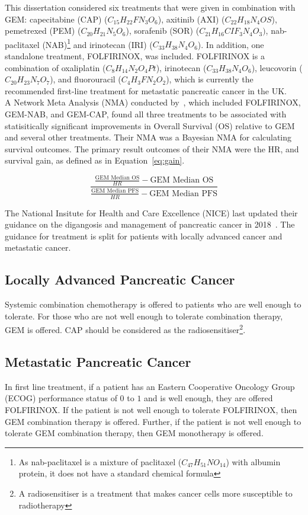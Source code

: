 This dissertation considered six treatments that were given in combination with GEM: capecitabine (CAP) ($C_{15}H_{22}FN_3O_6$), axitinib (AXI) ($C_{22}H_{18}N_4OS$), pemetrexed (PEM) ($C_{20}H_{21}N_5O_6$), sorafenib (SOR) ($C_{21}H_{16}CIF_{3}N_4O_3)$, nab-paclitaxel (NAB)\footnote{As nab-paclitaxel is a mixture of paclitaxel ($C_{47}H_{51}NO_{14}$) with albumin protein, it does not have a standard chemical formula} and irinotecan (IRI) ($C_{33}H_{38}N_4O_6$). In addition, one standalone treatment, FOLFIRINOX, was included. FOLFIRINOX is a combination of oxaliplatin ($C_{8}H_{14}N_{2}O_{4}Pt$), irinotecan ($C_{33}H_{38}N_{4}O_{6}$), leucovorin ($C_{20}H_{23}N_{7}O_{7}$), and fluorouracil ($C_{4}H_{3}FN_{2}O_{2}$), which is currently the recommended first-line treatment for metastatic pancreatic cancer in the UK.\\

A Network Meta Analysis (NMA) conducted by~\cite{gresham2014}, which included FOLFIRINOX, GEM-NAB, and GEM-CAP, found all three treatments to be associated with statisitically significant improvements in Overall Survival (OS) relative to GEM and several other treatments. Their NMA was a Bayesian NMA for calculating survival outcomes. The primary result outcomes of their NMA were the HR, and survival gain, as defined as in Equation~\ref{eq:gain}. 

\begin{equation}
    \frac{\frac{\text{GEM Median OS}}{HR}-\text{GEM Median OS}}{\frac{\text{GEM Median PFS}}{HR}-\text{GEM Median PFS}}
    \label{eq:gain}
\end{equation}

The National Insitute for Health and Care Excellence (NICE) last updated their guidance on the digangosis and management of pancreatic cancer in 2018~\cite{NG85}. The guidance for treatment is split for patients with locally advanced cancer and metastatic cancer.

\subsection{Locally Advanced Pancreatic Cancer}
Systemic combination chemotherapy is offered to patients who are well enough to tolerate. For those who are not well enough to tolerate combination therapy, GEM is offered. CAP should be considered as the radiosensitiser\footnote{A radiosensitiser is a treatment that makes cancer cells more susceptible to radiotherapy}.

\subsection{Metastatic Pancreatic Cancer}
In first line treatment, if a patient has an Eastern Cooperative Oncology Group (ECOG) performance status of $0$ to $1$ and is well enough, they are offered FOLFIRINOX. If the patient is not well enough to tolerate FOLFIRINOX, then GEM combination therapy is offered. Further, if the patient is not well enough to tolerate GEM combination therapy, then GEM monotherapy is offered. \\

